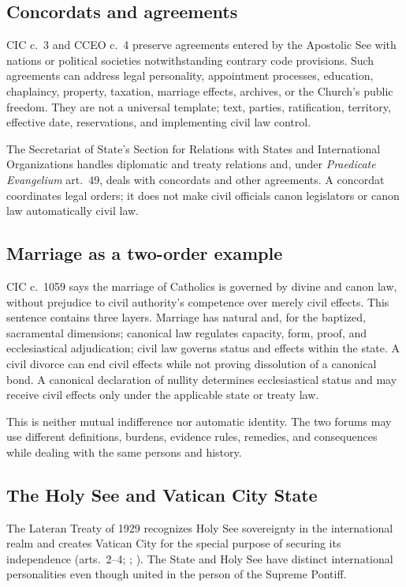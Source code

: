 \subsection{Concordats and agreements}

CIC c.~3 and CCEO c.~4 preserve agreements entered by the Apostolic See with nations or political societies notwithstanding contrary code provisions. Such agreements can address legal personality, appointment processes, education, chaplaincy, property, taxation, marriage effects, archives, or the Church's public freedom. They are not a universal template; text, parties, ratification, territory, effective date, reservations, and implementing civil law control.

The Secretariat of State's Section for Relations with States and International Organizations handles diplomatic and treaty relations and, under \emph{Praedicate Evangelium} art.~49, deals with concordats and other agreements. A concordat coordinates legal orders; it does not make civil officials canon legislators or canon law automatically civil law.

\subsection{Marriage as a two-order example}

CIC c.~1059 says the marriage of Catholics is governed by divine and canon law, without prejudice to civil authority's competence over merely civil effects. This sentence contains three layers. Marriage has natural and, for the baptized, sacramental dimensions; canonical law regulates capacity, form, proof, and ecclesiastical adjudication; civil law governs status and effects within the state. A civil divorce can end civil effects while not proving dissolution of a canonical bond. A canonical declaration of nullity determines ecclesiastical status and may receive civil effects only under the applicable state or treaty law.

This is neither mutual indifference nor automatic identity. The two forums may use different definitions, burdens, evidence rules, remedies, and consequences while dealing with the same persons and history.

\subsection{The Holy See and Vatican City State}

The Lateran Treaty of 1929 recognizes Holy See sovereignty in the international realm and creates Vatican City for the special purpose of securing its independence (arts.~2--4; ; ). The State and Holy See have distinct international personalities even though united in the person of the Supreme Pontiff.

